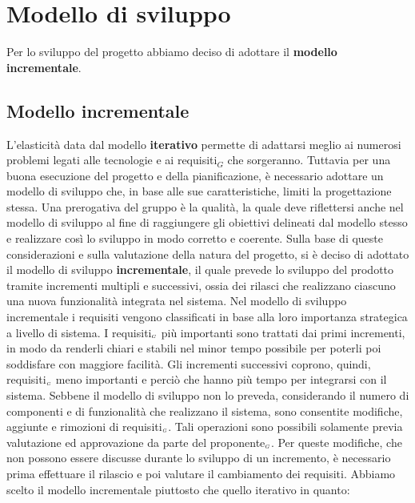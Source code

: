\chapter{Modello di sviluppo}\label{ModelloDiSviluppo}
Per lo sviluppo del progetto abbiamo deciso di adottare il \textbf{modello incrementale}.
\section{Modello incrementale}\label{ModelloDiSviluppoModelloIncrementale}
L'elasticità data dal modello \textbf{iterativo} permette di adattarsi meglio ai numerosi problemi legati alle tecnologie e ai requisiti$_G$ che sorgeranno.
Tuttavia per una buona esecuzione del progetto e della pianificazione, è necessario adottare un modello di sviluppo che, in base alle sue caratteristiche, limiti la progettazione stessa. Una prerogativa del gruppo è la qualità, la quale deve riflettersi anche nel modello di sviluppo al fine di raggiungere gli obiettivi delineati dal modello stesso e realizzare così lo sviluppo in modo corretto e coerente.
Sulla base di queste considerazioni e sulla valutazione della natura del progetto, si è deciso di adottato il modello di sviluppo \textbf{incrementale}, il quale prevede lo sviluppo del prodotto tramite incrementi multipli e successivi, ossia dei rilasci che realizzano ciascuno una nuova funzionalità integrata nel sistema.
Nel modello di sviluppo incrementale i requisiti vengono classificati in base alla loro importanza strategica a livello di sistema. I requisiti$_{\scaleto{G}{3pt}}$ più importanti sono trattati dai primi incrementi, in modo da renderli chiari e stabili nel minor tempo possibile per poterli poi soddisfare con maggiore facilità.
Gli incrementi successivi coprono, quindi, requisiti$_{\scaleto{G}{3pt}}$ meno importanti e perciò che hanno più tempo per integrarsi con il sistema.
Sebbene il modello di sviluppo non lo preveda, considerando il numero di componenti e di funzionalità che realizzano il sistema, sono consentite modifiche, aggiunte e rimozioni di requisiti$_{\scaleto{G}{3pt}}$.
Tali operazioni sono possibili solamente previa valutazione ed approvazione da parte del proponente$_{\scaleto{G}{3pt}}$. Per queste modifiche, che non possono essere discusse durante lo sviluppo di un incremento, è necessario prima effettuare il rilascio e poi valutare il cambiamento dei requisiti.
Abbiamo scelto il modello incrementale piuttosto che quello iterativo in quanto:
